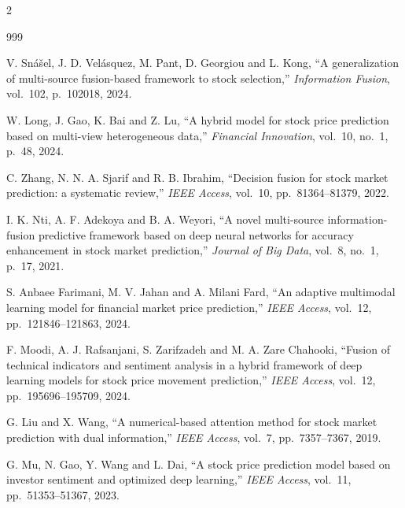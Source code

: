 \clearpage
{}
\begin{footnotesize}
\setlength{\parskip}{0pt}
\setlength{\columnsep}{16pt}
\begin{multicols}{2}
\begin{thebibliography}{999}
\setlength{\itemsep}{2pt}\setlength{\parsep}{0pt}

 V. Sn\'a\v{s}el, J. D. Vel\'asquez, M. Pant, D. Georgiou and L. Kong,
``A generalization of multi-source fusion-based framework to stock selection,''
\emph{Information Fusion}, vol.~102, p.~102018, 2024.

 W. Long, J. Gao, K. Bai and Z. Lu, ``A hybrid model for stock price
prediction based on multi-view heterogeneous data,'' \emph{Financial Innovation}, vol.~10,
no.~1, p.~48, 2024.

 C. Zhang, N. N. A. Sjarif and R. B. Ibrahim, ``Decision fusion for
stock market prediction: a systematic review,'' \emph{IEEE Access}, vol.~10, pp.~81364--81379,
2022.

 I. K. Nti, A. F. Adekoya and B. A. Weyori, ``A novel multi-source
information-fusion predictive framework based on deep neural networks for accuracy enhancement
in stock market prediction,'' \emph{Journal of Big Data}, vol.~8, no.~1, p.~17, 2021.

 S. Anbaee Farimani, M. V. Jahan and A. Milani Fard, ``An adaptive
multimodal learning model for financial market price prediction,'' \emph{IEEE Access}, vol.~12,
pp.~121846--121863, 2024.

 F. Moodi, A. J. Rafsanjani, S. Zarifzadeh and M. A. Zare Chahooki, ``Fusion
of technical indicators and sentiment analysis in a hybrid framework of deep learning models for
stock price movement prediction,'' \emph{IEEE Access}, vol.~12, pp.~195696--195709, 2024.

 G. Liu and X. Wang, ``A numerical-based attention method for stock
market prediction with dual information,'' \emph{IEEE Access}, vol.~7, pp.~7357--7367, 2019.

 G. Mu, N. Gao, Y. Wang and L. Dai, ``A stock price prediction model
based on investor sentiment and optimized deep learning,'' \emph{IEEE Access}, vol.~11,
pp.~51353--51367, 2023.


\end{thebibliography}
\end{multicols}
\end{footnotesize}
